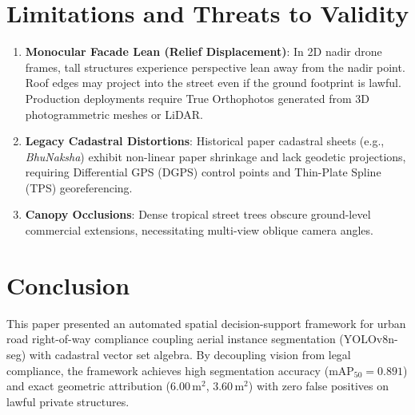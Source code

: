 \documentclass[conference]{IEEEtran}
\begin{document}
\section{Limitations and Threats to Validity}
\begin{enumerate}
    \item \textbf{Monocular Facade Lean (Relief Displacement)}: In 2D nadir drone frames, tall structures experience perspective lean away from the nadir point. Roof edges may project into the street even if the ground footprint is lawful. Production deployments require True Orthophotos generated from 3D photogrammetric meshes or LiDAR.
    \item \textbf{Legacy Cadastral Distortions}: Historical paper cadastral sheets (e.g., \textit{BhuNaksha}) exhibit non-linear paper shrinkage and lack geodetic projections, requiring Differential GPS (DGPS) control points and Thin-Plate Spline (TPS) georeferencing.
    \item \textbf{Canopy Occlusions}: Dense tropical street trees obscure ground-level commercial extensions, necessitating multi-view oblique camera angles.
\end{enumerate}

\section{Conclusion}
This paper presented an automated spatial decision-support framework for urban road right-of-way compliance coupling aerial instance segmentation (YOLOv8n-seg) with cadastral vector set algebra. By decoupling vision from legal compliance, the framework achieves high segmentation accuracy ($\text{mAP}_{50} = 0.891$) and exact geometric attribution ($6.00\,\text{m}^2$, $3.60\,\text{m}^2$) with zero false positives on lawful private structures.
\end{document}

